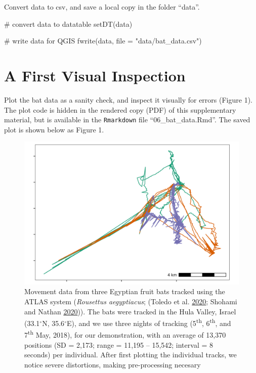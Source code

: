 \documentclass[]{scrreprt}
\newenvironment{Shaded}{}{}
\newcommand{\CommentTok}[1]{\textcolor[rgb]{0.00,0.50,0.00}{#1}}
\newcommand{\DataTypeTok}[1]{#1}
\newcommand{\KeywordTok}[1]{\textcolor[rgb]{0.00,0.00,1.00}{#1}}
\newcommand{\NormalTok}[1]{#1}
\newcommand{\StringTok}[1]{\textcolor[rgb]{0.00,0.50,0.50}{#1}}
\begin{document}
Convert data to csv, and save a local copy in the folder ``data''.

\begin{Shaded}
\begin{Highlighting}[]
\CommentTok{# convert data to datatable}
\KeywordTok{setDT}\NormalTok{(data)}

\CommentTok{# write data for QGIS}
\KeywordTok{fwrite}\NormalTok{(data, }\DataTypeTok{file =} \StringTok{"data/bat_data.csv"}\NormalTok{)}
\end{Highlighting}
\end{Shaded}

\hypertarget{a-first-visual-inspection}{%
\section{A First Visual Inspection}\label{a-first-visual-inspection}}

Plot the bat data as a sanity check, and inspect it visually for errors (Figure 1).
The plot code is hidden in the rendered copy (PDF) of this supplementary material, but is available in the \texttt{Rmarkdown} file ``06\_bat\_data.Rmd''.
The saved plot is shown below as Figure 1.

\begin{figure}
\centering
\includegraphics{figures/fig_bat_raw.png}
\caption{Movement data from three Egyptian fruit bats tracked using the ATLAS system (\emph{Rousettus aegyptiacus}; (Toledo et al. \protect\hyperlink{ref-toledo2020}{2020}; Shohami and Nathan \protect\hyperlink{ref-shohami2020}{2020})).
The bats were tracked in the Hula Valley, Israel (33.1\(^{\circ}\)N, 35.6\(^{\circ}\)E), and we use three nights of tracking (5\textsuperscript{th}, 6\textsuperscript{th}, and 7\textsuperscript{th} May, 2018), for our demonstration, with an average of 13,370 positions (SD = 2,173; range = 11,195 -- 15,542; interval = 8 seconds) per individual.
After first plotting the individual tracks, we notice severe distortions, making pre-processing necesary}
\end{figure}
\end{document}
